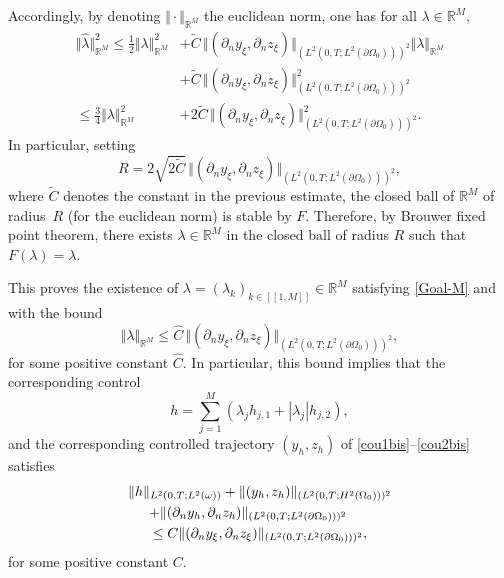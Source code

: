 \documentclass[JEP,XML,SOM,Unicode,NoFloatCountersInSection]{cedram}
\newcommand{\llbracket}{[\![}
\newcommand{\rrbracket}{]\!]}
\newcommand\R{{\mathbb R}}
\newcommand{\norm}[1]{\Vert#1\Vert}
\theoremstyle{definition}
\begin{document}
Accordingly, by denoting $\Vert {\cdot} \Vert_{\R^M}$ the euclidean norm, one has for all $\lambda \in \R^M$,
\begin{align*}
\norm{\widehat \lambda}_{\R^M}^2
\leq
\frac{1}{2} \norm{ \lambda}_{\R^M}^2
&+
\tilde{C}\, \norm{(\partial_n y_\xi, \partial_n z_\xi)}_{(L^2(0,T; L^2(\partial \Omega_0)))^2} \norm{\lambda}_{\R^M}\\
&+
\tilde{C}\, \norm{(\partial_n y_\xi, \partial_n z_\xi)}_{(L^2(0,T; L^2(\partial \Omega_0)))^2}^2
\\
\leq
\frac{3}{4} \norm{\lambda}_{\R^M}^2
&+
2\tilde{C}\,\norm{(\partial_n y_\xi, \partial_n z_\xi)}_{(L^2(0,T; L^2(\partial \Omega_0)))^2}^2.
\end{align*}
In particular, setting
\[
R = 2\sqrt{2\tilde C}\, \norm{(\partial_n y_\xi, \partial_n z_\xi)}_{(L^2(0,T; L^2(\partial \Omega_0)))^2},
\]
where $\tilde C$ denotes the constant in the previous estimate, the closed ball of $\R^M$ of radius~$R$ (for the euclidean norm) is stable by $F$. Therefore, by Brouwer fixed point theorem, there exists $\lambda \in \R^M$ in the closed ball of radius $R$ such that $F(\lambda) = \lambda$.

This proves the existence of $\lambda = (\lambda_k)_{k \in \llbracket 1,M \rrbracket } \in \R^M$ satisfying \eqref{Goal-M} and with the bound
\begin{equation}
\label{Est-Lambda}
\norm{\lambda}_{\R^M} \leq \widehat C\, \norm{(\partial_n y_\xi, \partial_n z_\xi)}_{(L^2(0,T; L^2(\partial \Omega_0)))^2},
\end{equation}
for some positive constant $\widehat C$.
In particular, this bound implies that the corresponding control
\begin{equation}
\label{Control-h-Exact}
h = \sum_{j= 1}^M (\lambda_{j} h_{j,1} + |\lambda_{j}| h_{j,2}),
\end{equation}
and the corresponding controlled trajectory $(y_h,z_h)$ of \eqref{cou1bis}--\eqref{cou2bis} satisfies
\begin{multline}
\label{Bound-p-n-y-h-z-h}
\norm{h}_{L^2(0,T; L^2(\omega))}
+
\norm{(y_h,z_h)}_{(L^2(0,T; H^2(\Omega_0)))^2}\\
\hspace*{-6mm}+
\norm{(\partial_n y_h, \partial_n z_h)}_{(L^2(0,T; L^2(\partial \Omega_0)))^2}
\\
\leq
C \norm{(\partial_n y_\xi, \partial_n z_\xi)}_{(L^2(0,T; L^2(\partial \Omega_0)))^2},
\end{multline}
for some positive constant $C$.
\end{document}
